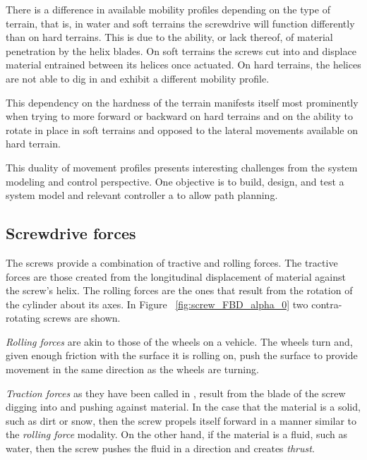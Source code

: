 There is a difference in available mobility profiles depending on the type of
terrain, that is, in water and soft terrains the screwdrive will function
differently than on hard terrains. This is due to the ability, or lack thereof,
of material penetration by the helix blades. On soft terrains the screws cut
into and displace material entrained between its helices once actuated. On hard
terrains, the helices are not able to dig in and exhibit a different mobility
profile.

This dependency on the hardness of the terrain manifests itself most prominently
when trying to more forward or backward on hard terrains and on the ability to
rotate in place in soft terrains and opposed to the lateral movements available
on hard terrain.

This duality of movement profiles presents interesting challenges from the
system modeling and control perspective. One objective is to build, design, and
test a system model and relevant controller a to allow path planning.



\subsection{Screwdrive forces}

The screws provide a combination of tractive and rolling forces. The tractive
forces are those created from the longitudinal displacement of material against
the screw's helix. The rolling forces are the ones that result from the rotation
of the cylinder about its axes. In Figure~ \ref{fig:screw_FBD_alpha_0} two
contra-rotating screws are shown.

\emph{Rolling forces} are akin to those of the wheels on a vehicle. The wheels
turn and, given enough friction with the surface it is rolling on, push the
surface to provide movement in the same direction as the wheels are turning.

\emph{Traction forces} as they have been called in \cite{Freeberg2010}, result
from the blade of the screw digging into and pushing against material. In the
case that the material is a solid, such as dirt or snow, then the screw propels
itself forward in a manner similar to the \emph{rolling force} modality. On the
other hand, if the material is a fluid, such as water, then the screw pushes the
fluid in a direction and creates \emph{thrust}.

